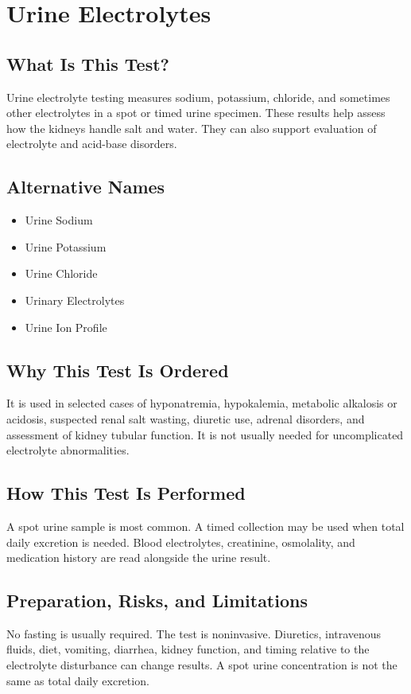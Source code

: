 \chapter{Urine Electrolytes}

\section*{What Is This Test?}
Urine electrolyte testing measures sodium, potassium, chloride, and sometimes other electrolytes in a spot or timed urine specimen. These results help assess how the kidneys handle salt and water. They can also support evaluation of electrolyte and acid-base disorders.

\section*{Alternative Names}
\begin{itemize}
  \item Urine Sodium
  \item Urine Potassium
  \item Urine Chloride
  \item Urinary Electrolytes
  \item Urine Ion Profile
\end{itemize}
\section*{Why This Test Is Ordered}
It is used in selected cases of hyponatremia, hypokalemia, metabolic alkalosis or acidosis, suspected renal salt wasting, diuretic use, adrenal disorders, and assessment of kidney tubular function. It is not usually needed for uncomplicated electrolyte abnormalities.

\section*{How This Test Is Performed}
A spot urine sample is most common. A timed collection may be used when total daily excretion is needed. Blood electrolytes, creatinine, osmolality, and medication history are read alongside the urine result.

\section*{Preparation, Risks, and Limitations}
No fasting is usually required. The test is noninvasive. Diuretics, intravenous fluids, diet, vomiting, diarrhea, kidney function, and timing relative to the electrolyte disturbance can change results. A spot urine concentration is not the same as total daily excretion.

